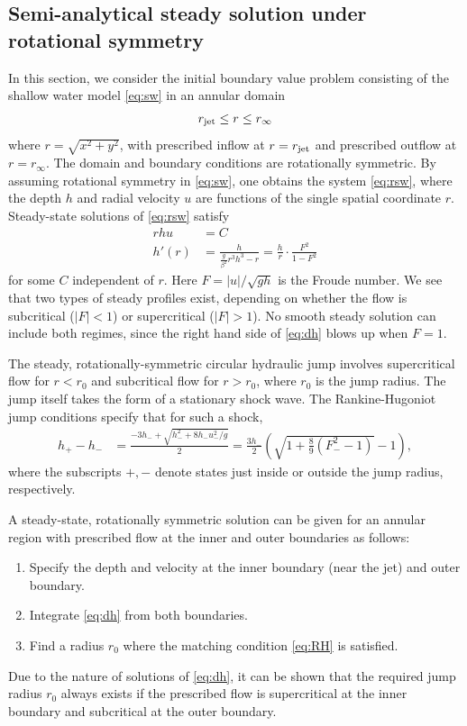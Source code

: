 \documentclass[preprint, 11pt]{article}
\begin{document}
\subsection{Semi-analytical steady solution under rotational symmetry}\label{sec:steady_chj}
In this section, we consider the initial boundary value problem consisting of the
shallow water model \eqref{eq:sw} in an annular domain
\begin{align}
r_\textup{jet} \le r \le r_\infty
\end{align}
where $r = \sqrt{x^2+y^2}$, with prescribed inflow at $r=r_\textup{jet}$
and prescribed outflow at $r=r_\infty$.
The domain and boundary conditions are rotationally symmetric.
By assuming rotational symmetry in \eqref{eq:sw}, one obtains the system
\eqref{eq:rsw},
where the depth $h$ and radial velocity $u$ are functions of the single spatial coordinate $r$.
Steady-state solutions of \eqref{eq:rsw} satisfy
\begin{subequations}\label{steady}
\begin{align}
    rhu & = C \\
    h'(r) & = \frac{h}{\frac{g}{\beta^2} r^3 h^3 -r} = \frac{h}{r} \cdot \frac{F^2}{1-F^2} \label{eq:dh}
\end{align}
\end{subequations}
for some $C$ independent of $r$.  Here $F=|u|/\sqrt{gh}$ is the Froude number.
We see that two types of steady profiles exist, depending on whether the flow
is subcritical ($|F|<1$) or supercritical ($|F|>1$).  No smooth steady solution can
include both regimes, since the right hand side of \eqref{eq:dh} blows up when $F=1$.

The steady, rotationally-symmetric circular hydraulic jump involves supercritical
flow for $r<r_0$ and subcritical flow for $r>r_0$, where $r_0$ is the jump radius.
The jump itself takes the form of a stationary shock wave.  The Rankine-Hugoniot jump
conditions specify that for such a shock,
\begin{align} \label{eq:RH}
    h_+ - h_- & = \frac{-3h_- + \sqrt{h_-^2 + 8 h_- u_-^2/g}}{2} = \frac{3h_-}{2}\left(\sqrt{1+\frac{8}{9}(F_-^2-1)}-1\right),
\end{align}
where the subscripts $+, -$ denote states just inside or outside the jump radius, respectively.

A steady-state, rotationally symmetric solution can be given for an annular region with prescribed
flow at the inner and outer boundaries as follows:

\begin{enumerate}
    \item Specify the depth and velocity at the inner boundary (near the jet) and outer boundary.
    \item Integrate \eqref{eq:dh} from both boundaries.
    \item Find a radius $r_0$ where the matching condition \eqref{eq:RH} is satisfied.
\end{enumerate}
Due to the nature of solutions of \eqref{eq:dh}, it can be shown that the required jump
radius $r_0$ always exists if the prescribed flow is supercritical at the inner boundary
and subcritical at the outer boundary.
\end{document}
